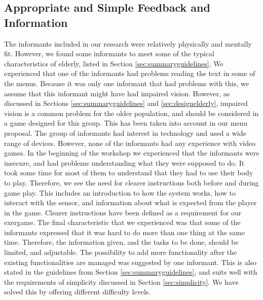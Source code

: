 \subsection{Appropriate and Simple Feedback and Information}
The informants included in our research were relatively physically and mentally fit. However, we found some informants to meet some of the typical characteristics of elderly, listed in Section \ref{sec:summaryguidelines}. We experienced that one of the informants had problems reading the text in some of the menus. Because it was only one informant that had problems with this, we assume that this informant might have had impaired vision. However, as discussed in Sections \ref{sec:summaryguidelines} and  \ref{sec:designelderly}, impaired vision is a common problem for the older population, and should be considered in a game designed for this group. This has been taken into account in our menu proposal. The group of informants had interest in technology and used a wide range of devices. However, none of the informants had any experience with video games. In the beginning of the workshop we experienced that the informants were insecure, and had problems understanding what they were supposed to do. It took some time for most of them to understand that they had to use their body to play. Therefore, we see the need for clearer instructions both before and during game play. This includes an introduction to how the system works, how to interact with the sensor, and information about what is expected from the player in the game. Clearer instructions have been defined as a requirement for our exergame. The final characteristic that we experienced was that some of the informants expressed that it was hard to do more than one thing at the same time. Therefore, the information given, and the tasks to be done, should be limited, and adjustable. The possibility to add more functionality after the existing functionalities are managed was suggested by one informant. This is also stated in the guidelines from Section \ref{sec:summaryguidelines}, and suits well with the requirements of simplicity discussed in Section \ref{sec:simplicity}. We have solved this by offering different difficulty levels. 

